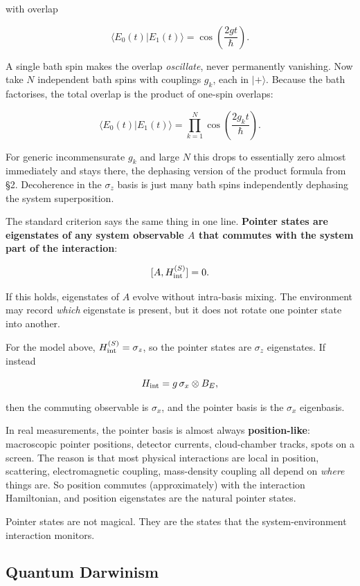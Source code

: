 \documentclass[11pt,a4paper]{article}
\begin{document}
with overlap

\[
\langle E_0(t) | E_1(t)\rangle = \cos\!\left(\frac{2gt}{\hbar}\right).
\]

A single bath spin makes the overlap \emph{oscillate}, never permanently vanishing. Now take $N$ independent bath spins with couplings $g_k$, each in $|+\rangle$. Because the bath factorises, the total overlap is the product of one-spin overlaps:

\[
\langle E_0(t) | E_1(t)\rangle = \prod_{k=1}^N \cos\!\left(\frac{2 g_k t}{\hbar}\right).
\]

For generic incommensurate $g_k$ and large $N$ this drops to essentially zero almost immediately and stays there, the dephasing version of the product formula from §2. Decoherence in the $\sigma_z$ basis is just many bath spins independently dephasing the system superposition.

The standard criterion says the same thing in one line. \textbf{Pointer states are eigenstates of any system observable $A$ that commutes with the system part of the interaction}:

\[
[A, H_{\rm int}^{(S)}] = 0.
\]

If this holds, eigenstates of $A$ evolve without intra-basis mixing. The environment may record \emph{which} eigenstate is present, but it does not rotate one pointer state into another.

For the model above, $H_{\rm int}^{(S)} = \sigma_z$, so the pointer states are $\sigma_z$ eigenstates. If instead

\[
H_{\rm int} = g\,\sigma_x \otimes B_E,
\]

then the commuting observable is $\sigma_x$, and the pointer basis is the $\sigma_x$ eigenbasis.

In real measurements, the pointer basis is almost always \textbf{position-like}: macroscopic pointer positions, detector currents, cloud-chamber tracks, spots on a screen. The reason is that most physical interactions are local in position, scattering, electromagnetic coupling, mass-density coupling all depend on \emph{where} things are. So position commutes (approximately) with the interaction Hamiltonian, and position eigenstates are the natural pointer states.

Pointer states are not magical. They are the states that the system-environment interaction monitors.

\subsection{Quantum Darwinism}
\end{document}
